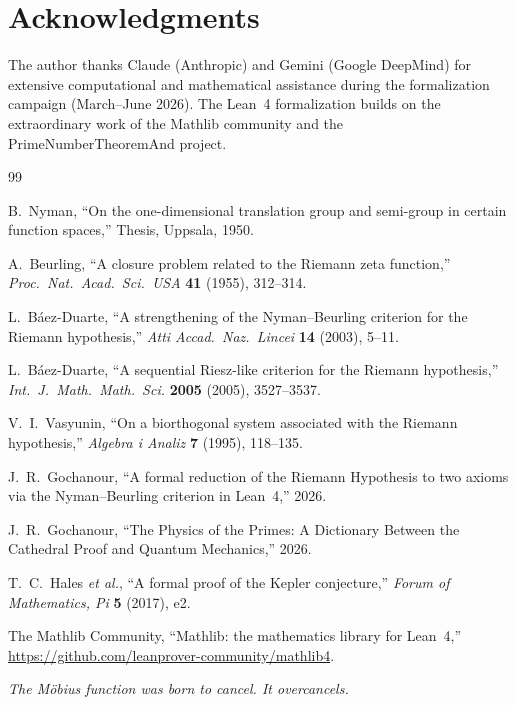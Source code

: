 \documentclass[11pt,a4paper]{article}
\begin{document}
\section*{Acknowledgments}

The author thanks Claude (Anthropic) and Gemini (Google DeepMind)
for extensive computational and mathematical assistance during the
formalization campaign (March--June 2026). The Lean~4 formalization
builds on the extraordinary work of the Mathlib community and the
PrimeNumberTheoremAnd project.

\begin{thebibliography}{99}

B.~Nyman,
``On the one-dimensional translation group and semi-group in certain
function spaces,''
Thesis, Uppsala, 1950.

A.~Beurling,
``A closure problem related to the Riemann zeta function,''
\emph{Proc.\ Nat.\ Acad.\ Sci.\ USA} \textbf{41} (1955), 312--314.

L.~B\'aez-Duarte,
``A strengthening of the Nyman--Beurling criterion for the Riemann
hypothesis,''
\emph{Atti Accad.\ Naz.\ Lincei} \textbf{14} (2003), 5--11.

L.~B\'aez-Duarte,
``A sequential Riesz-like criterion for the Riemann hypothesis,''
\emph{Int.\ J.\ Math.\ Math.\ Sci.} \textbf{2005} (2005), 3527--3537.

V.~I.~Vasyunin,
``On a biorthogonal system associated with the Riemann hypothesis,''
\emph{Algebra i Analiz} \textbf{7} (1995), 118--135.

J.~R.~Gochanour,
``A formal reduction of the Riemann Hypothesis to two axioms
via the Nyman--Beurling criterion in Lean~4,''
2026.

J.~R.~Gochanour,
``The Physics of the Primes: A Dictionary Between the Cathedral
Proof and Quantum Mechanics,''
2026.

T.~C.~Hales \emph{et al.},
``A formal proof of the Kepler conjecture,''
\emph{Forum of Mathematics, Pi} \textbf{5} (2017), e2.

The Mathlib Community,
``Mathlib: the mathematics library for Lean~4,''
\url{https://github.com/leanprover-community/mathlib4}.

\end{thebibliography}

\vfill
\begin{center}
\itshape
The M\"obius function was born to cancel. It overcancels.
\end{center}
\end{document}
